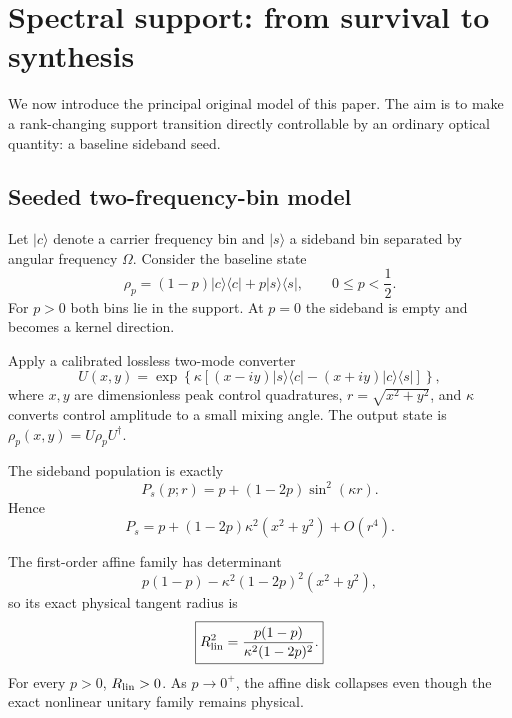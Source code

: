 \documentclass[aps,pra,reprint,superscriptaddress,longbibliography]{revtex4-2}
\begin{document}
\section{Spectral support: from survival to synthesis}

We now introduce the principal original model of this paper. The aim is to make a rank-changing support transition directly controllable by an ordinary optical quantity: a baseline sideband seed.

\subsection{Seeded two-frequency-bin model}

Let $|c\rangle$ denote a carrier frequency bin and $|s\rangle$ a sideband bin separated by angular frequency $\Omega$. Consider the baseline state
\begin{equation}
\rho_p=(1-p)|c\rangle\langle c|+p|s\rangle\langle s|,
\qquad 0\le p<\frac12.
\label{eq:rho_p}
\end{equation}
For $p>0$ both bins lie in the support. At $p=0$ the sideband is empty and becomes a kernel direction.

Apply a calibrated lossless two-mode converter
\begin{equation}
U(x,y)=\exp\!\left\{\kappa[(x-iy)|s\rangle\langle c|-(x+iy)|c\rangle\langle s|]\right\},
\label{eq:converter}
\end{equation}
where $x,y$ are dimensionless peak control quadratures, $r=\sqrt{x^2+y^2}$, and $\kappa$ converts control amplitude to a small mixing angle. The output state is $\rho_p(x,y)=U\rho_pU^\dagger$.

The sideband population is exactly
\begin{equation}
\boxed{
P_s(p;r)=p+(1-2p)\sin^2(\kappa r).}
\label{eq:sideband_population}
\end{equation}
Hence
\begin{equation}
P_s=p+(1-2p)\kappa^2(x^2+y^2)+O(r^4).
\end{equation}

The first-order affine family has determinant
\begin{equation}
p(1-p)-\kappa^2(1-2p)^2(x^2+y^2),
\end{equation}
so its exact physical tangent radius is
\begin{equation}
\boxed{
R_{\rm lin}^2=
\frac{p(1-p)}{\kappa^2(1-2p)^2}.}
\label{eq:Rlin}
\end{equation}
For every $p>0$, $R_{\rm lin}>0$. As $p\to0^+$, the affine disk collapses even though the exact nonlinear unitary family remains physical.
\end{document}
